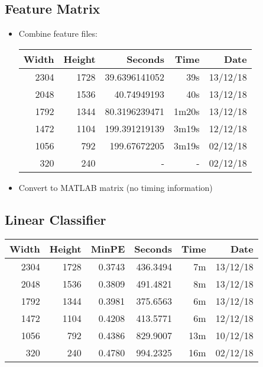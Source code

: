 \subsection{Feature Matrix}
\begin{itemize}
  \item Combine feature files:
  \begin{center}
  \begin{tabular}{ r r | r r r }
  Width & Height & Seconds & Time & Date \\ \hline
  2304 & 1728 & 39.6396141052 & 39s & 13/12/18 \\
  2048 & 1536 & 40.74949193 & 40s & 13/12/18 \\
  1792 & 1344 & 80.3196239471 & 1m20s & 13/12/18 \\
  1472 & 1104 & 199.391219139 & 3m19s & 12/12/18 \\
  1056 & 792 & 199.67672205 & 3m19s & 02/12/18 \\
  320 & 240 & - & - & 02/12/18 \\
  \end{tabular}
  \end{center}

  \item Convert to MATLAB matrix (no timing information)
\end{itemize}

\subsection{Linear Classifier}
  \begin{center}
  \begin{tabular}{ r r | r | r r r }
  Width & Height & MinPE & Seconds & Time & Date \\ \hline
  2304 & 1728 & 0.3743 & 436.3494 & 7m & 13/12/18 \\
  2048 & 1536 & 0.3809 & 491.4821 & 8m & 13/12/18 \\
  1792 & 1344 & 0.3981 & 375.6563 & 6m & 13/12/18 \\
  1472 & 1104 & 0.4208 & 413.5771 & 6m & 12/12/18 \\
  1056 & 792 & 0.4386 & 829.9007 & 13m & 10/12/18 \\
  320 & 240 & 0.4780 & 994.2325 & 16m & 02/12/18 \\
  \end{tabular}
  \end{center}